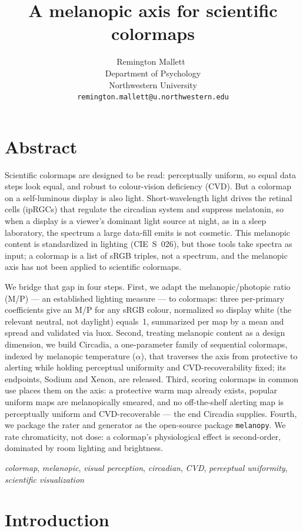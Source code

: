 \documentclass[10pt,a4paper,twocolumn]{article}
\title{\bf A melanopic axis for scientific colormaps}
\author{
    Remington Mallett~\orcidlink{0000-0001-6183-3098} \\ %
    Department of Psychology \\
    Northwestern University \\
    \texttt{remington.mallett@u.northwestern.edu}
}
\date{}
\begin{document}
\maketitle

\section*{Abstract}
Scientific colormaps are designed to be read: perceptually uniform, so equal data steps look equal, and robust to colour-vision deficiency (CVD).
But a colormap on a self-luminous display is also light.
Short-wavelength light drives the retinal cells (ipRGCs) that regulate the circadian system and suppress melatonin, so when a display is a viewer's dominant light source at night, as in a sleep laboratory, the spectrum a large data-fill emits is not cosmetic.
This melanopic content is standardized in lighting (CIE~S~026), but those tools take spectra as input; a colormap is a list of sRGB triples, not a spectrum, and the melanopic axis has not been applied to scientific colormaps.

We bridge that gap in four steps.
First, we adapt the melanopic/photopic ratio (M/P) --- an established lighting measure --- to colormaps: three per-primary coefficients give an M/P for any sRGB colour, normalized so display white (the relevant neutral, not daylight) equals~1, summarized per map by a mean and spread and validated via luox.
Second, treating melanopic content as a design dimension, we build Circadia, a one-parameter family of sequential colormaps, indexed by melanopic temperature ($\alpha$), that traverses the axis from protective to alerting while holding perceptual uniformity and CVD-recoverability fixed; its endpoints, Sodium and Xenon, are released.
Third, scoring colormaps in common use places them on the axis: a protective warm map already exists, popular uniform maps are melanopically smeared, and no off-the-shelf alerting map is perceptually uniform and CVD-recoverable --- the end Circadia supplies.
Fourth, we package the rater and generator as the open-source package \texttt{melanopy}.
We rate chromaticity, not dose: a colormap's physiological effect is second-order, dominated by room lighting and brightness.

\bigskip
{} \emph{colormap}, \emph{melanopic}, \emph{visual perception}, \emph{circadian}, \emph{CVD}, \emph{perceptual uniformity}, \emph{scientific visualization}

\section{Introduction}\label{sec:introduction}
\end{document}
